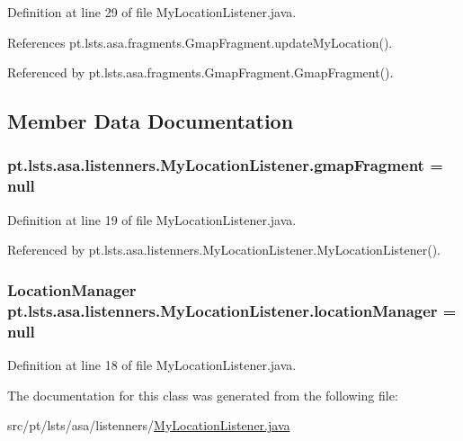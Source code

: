 Definition at line 29 of file My\+Location\+Listener.\+java.



References pt.\+lsts.\+asa.\+fragments.\+Gmap\+Fragment.\+update\+My\+Location().



Referenced by pt.\+lsts.\+asa.\+fragments.\+Gmap\+Fragment.\+Gmap\+Fragment().



\subsection{Member Data Documentation}
\hypertarget{classpt_1_1lsts_1_1asa_1_1listenners_1_1MyLocationListener_ace35f73344448e8a08a8c456c82de12d}{}
\subsubsection[{gmap\+Fragment}]{ pt.\+lsts.\+asa.\+listenners.\+My\+Location\+Listener.\+gmap\+Fragment = null\hspace{0.3cm}{\ttfamily [private]}}\label{classpt_1_1lsts_1_1asa_1_1listenners_1_1MyLocationListener_ace35f73344448e8a08a8c456c82de12d}


Definition at line 19 of file My\+Location\+Listener.\+java.



Referenced by pt.\+lsts.\+asa.\+listenners.\+My\+Location\+Listener.\+My\+Location\+Listener().

\hypertarget{classpt_1_1lsts_1_1asa_1_1listenners_1_1MyLocationListener_a085b8eb27f3299f763e51c9241e95557}{}
\subsubsection[{location\+Manager}]{\setlength{\rightskip}{0pt plus 5cm}Location\+Manager pt.\+lsts.\+asa.\+listenners.\+My\+Location\+Listener.\+location\+Manager = null\hspace{0.3cm}{\ttfamily [private]}}\label{classpt_1_1lsts_1_1asa_1_1listenners_1_1MyLocationListener_a085b8eb27f3299f763e51c9241e95557}


Definition at line 18 of file My\+Location\+Listener.\+java.



The documentation for this class was generated from the following file\+:\begin{DoxyCompactItemize}
\item 
src/pt/lsts/asa/listenners/\hyperlink{MyLocationListener_8java}{My\+Location\+Listener.\+java}\end{DoxyCompactItemize}
